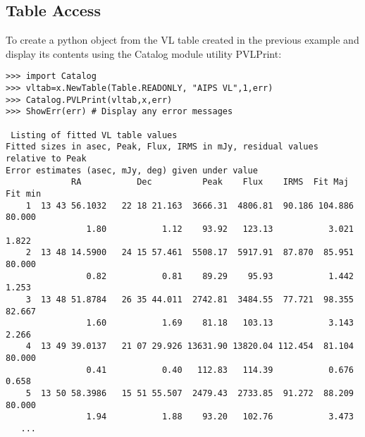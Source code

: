 \documentclass[11pt]{report}
\begin{document}
\subsection{Table Access}
To create a python object from the VL table created in the previous example
and display its contents using the Catalog module utility PVLPrint:
\begin{verbatim}
>>> import Catalog
>>> vltab=x.NewTable(Table.READONLY, "AIPS VL",1,err)
>>> Catalog.PVLPrint(vltab,x,err)
>>> ShowErr(err) # Display any error messages

 Listing of fitted VL table values
Fitted sizes in asec, Peak, Flux, IRMS in mJy, residual values relative to Peak
Error estimates (asec, mJy, deg) given under value
             RA           Dec          Peak    Flux    IRMS  Fit Maj Fit min 
    1  13 43 56.1032   22 18 21.163  3666.31  4806.81  90.186 104.886  80.000
                1.80           1.12    93.92   123.13           3.021   1.822
    2  13 48 14.5900   24 15 57.461  5508.17  5917.91  87.870  85.951  80.000
                0.82           0.81    89.29    95.93           1.442   1.253
    3  13 48 51.8784   26 35 44.011  2742.81  3484.55  77.721  98.355  82.667
                1.60           1.69    81.18   103.13           3.143   2.266
    4  13 49 39.0137   21 07 29.926 13631.90 13820.04 112.454  81.104  80.000
                0.41           0.40   112.83   114.39           0.676   0.658
    5  13 50 58.3986   15 51 55.507  2479.43  2733.85  91.272  88.209  80.000
                1.94           1.88    93.20   102.76           3.473
   ...
\end{verbatim}
\end{document}
